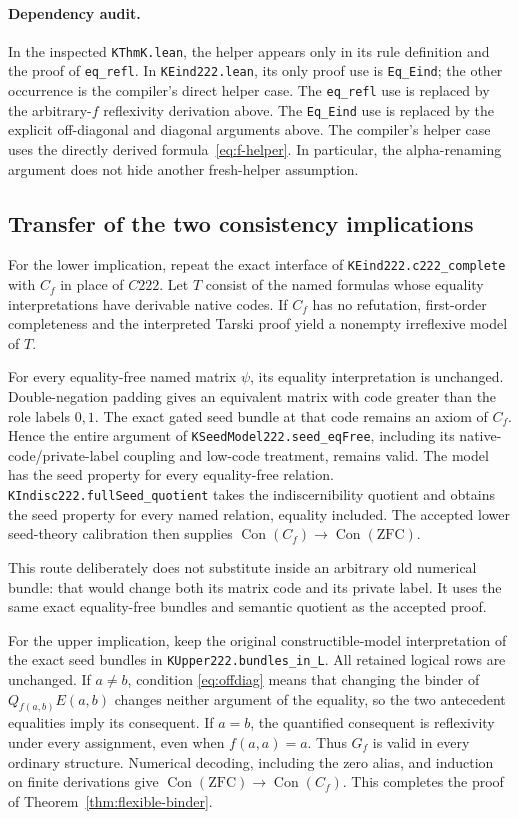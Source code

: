 \paragraph{Dependency audit.}
In the inspected \texttt{KThmK.lean}, the helper appears only in its rule
definition and the proof of \texttt{eq\_refl}. In
\texttt{KEind222.lean}, its only proof use is
\texttt{Eq\_Eind}; the other occurrence is the compiler's direct helper
case. The \texttt{eq\_refl} use is replaced by the arbitrary-$f$ reflexivity
derivation above. The \texttt{Eq\_Eind} use is replaced by the explicit
off-diagonal and diagonal arguments above. The compiler's helper case
uses the directly derived formula~\eqref{eq:f-helper}. In particular,
the alpha-renaming argument does not hide another fresh-helper
assumption.

\subsection{Transfer of the two consistency implications}

For the lower implication, repeat the exact interface of
\texttt{KEind222.c222\_complete} with $C_f$ in place of $C222$.
Let $T$ consist of the named formulas whose equality interpretations have
derivable native codes. If $C_f$ has no refutation, first-order
completeness and the interpreted Tarski proof yield a nonempty
irreflexive model of $T$.

For every equality-free named matrix $\psi$, its equality interpretation
is unchanged. Double-negation padding gives an equivalent matrix with
code greater than the role labels $0,1$. The exact gated seed bundle at
that code remains an axiom of $C_f$. Hence the entire argument of
\texttt{KSeedModel222.seed\_eqFree}, including its native-code/private-label
coupling and low-code treatment, remains valid. The model has the seed
property for every equality-free relation.
\texttt{KIndisc222.fullSeed\_quotient} takes the indiscernibility quotient
and obtains the seed property for every named relation, equality included.
The accepted lower seed-theory calibration then supplies
$\operatorname{Con}(C_f)\to\operatorname{Con}(\mathrm{ZFC})$.

This route deliberately does not substitute inside an arbitrary old
numerical bundle: that would change both its matrix code and its private
label. It uses the same exact equality-free bundles and semantic quotient
as the accepted proof.

For the upper implication, keep the original constructible-model
interpretation of the exact seed bundles in
\texttt{KUpper222.bundles\_in\_L}. All retained logical rows are unchanged.
If $a\ne b$, condition \eqref{eq:offdiag} means that changing the binder
of $Q_{f(a,b)}E(a,b)$ changes neither argument of the equality, so the two
antecedent equalities imply its consequent. If $a=b$, the quantified
consequent is reflexivity under every assignment, even when $f(a,a)=a$.
Thus $G_f$ is valid in every ordinary structure. Numerical decoding,
including the zero alias, and induction on finite derivations give
$\operatorname{Con}(\mathrm{ZFC})\to\operatorname{Con}(C_f)$.
This completes the proof of Theorem~\ref{thm:flexible-binder}.

